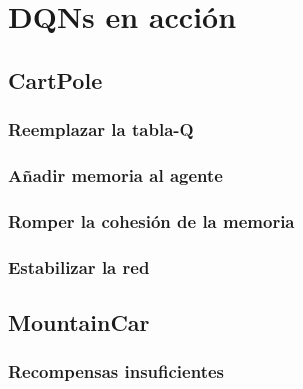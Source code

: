 \chapter{DQNs en acción}
\label{cap:dqnEnAccion}


\section{CartPole}

\subsection{Reemplazar la tabla-Q}

\subsection{Añadir memoria al agente}

\subsection{Romper la cohesión de la memoria}

\subsection{Estabilizar la red}

\section{MountainCar}

\subsection{Recompensas insuficientes}
